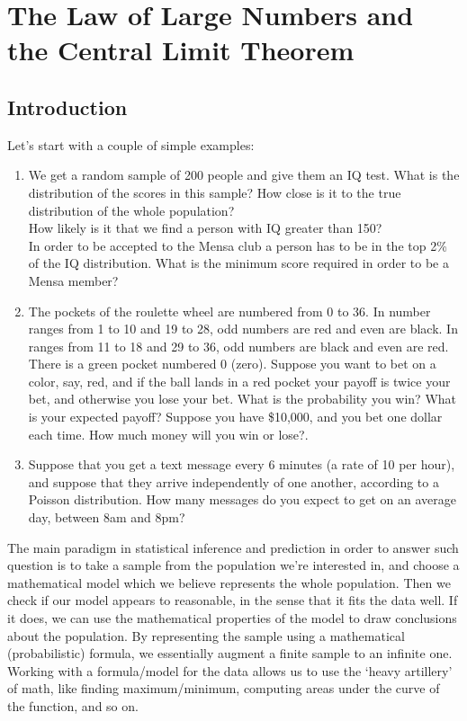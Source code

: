 \hypertarget{ch:llnclt}{%
\chapter{The Law of Large Numbers and the Central Limit Theorem}\label{ch:llnclt}}

\section{Introduction}
Let's start with a couple of simple examples:
\begin{enumerate}
\item We get a random sample of 200 people and give them an IQ test. What is the distribution of the scores in this sample? How close is it to the true distribution of the whole population?\\
How likely is it that we find a person with IQ greater than 150?\\
In order to be accepted to the Mensa club a person has to be in the top 2\% of the IQ distribution. What is the minimum score required in order to be a Mensa member?
\item The pockets of the roulette wheel are numbered from 0 to 36. In number ranges from 1 to 10 and 19 to 28, odd numbers are red and even are black. In ranges from 11 to 18 and 29 to 36, odd numbers are black and even are red. There is a green pocket numbered 0 (zero). Suppose you want to bet on a color, say, red, and if the ball lands in a red pocket your payoff is twice your bet, and otherwise you lose your bet. What is the probability you win? What is your expected payoff? Suppose you have \$10,000, and you bet one dollar each time. How much money will you win or lose?.
\item Suppose that you get a text message every 6 minutes (a rate of 10 per hour), and suppose that they arrive independently of one another, according to a Poisson distribution. How many messages do you expect to get on an average day, between 8am and 8pm? 
\end{enumerate}

The main paradigm in statistical inference and prediction in order to answer such question is to take a sample from the population we're interested in, and choose a mathematical model which we believe represents the whole population. Then we check if our model appears to reasonable, in the sense that it fits the data well. If it does, we can use the mathematical properties of the model to draw conclusions about the population. By representing the sample using a mathematical (probabilistic) formula, we essentially augment a finite sample to an infinite one. Working with a formula/model for the data allows us to use the `heavy artillery' of math, like finding maximum/minimum, computing areas under the curve of the function, and so on. 

